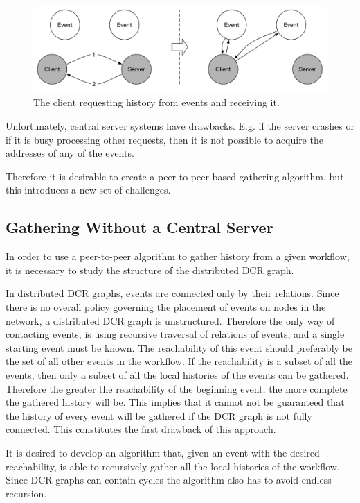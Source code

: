     \begin{figure}[H]
    	\centering
    	\includegraphics[width=\textwidth]{4connect/images/server-contacts-events.pdf}
    	\caption{The client requesting history from events and receiving it.}
    	\label{fig:connecting:server-contacts-events}
    \end{figure}
    
    \newpar Unfortunately, central server systems have drawbacks. E.g. if the server crashes or if it is busy processing other requests, then it is not possible to acquire the addresses of any of the events.
    
    Therefore it is desirable to create a peer to peer-based gathering algorithm, but this introduces a new set of challenges.
    
    \subsection{Gathering Without a Central Server}
    In order to use a peer-to-peer algorithm to gather history from a given workflow, it is necessary to study the structure of the distributed DCR graph.
    
    \newpar In distributed DCR graphs, events are connected only by their relations. Since there is no overall policy governing the placement of events on nodes in the network, a distributed DCR graph is unstructured. Therefore the only way of contacting events, is using recursive traversal of relations of events, and a single starting event must be known. The reachability of this event should preferably be the set of all other events in the workflow. If the reachability is a subset of all the events, then only a subset of all the local histories of the events can be gathered. Therefore the greater the reachability of the beginning event, the more complete the gathered history will be. This implies that it cannot not be guaranteed that the history of every event will be gathered if the DCR graph is not fully connected. This constitutes the first drawback of this approach.
	
	It is desired to develop an algorithm that, given an event with the desired reachability, is able to recursively gather all the local histories of the workflow. Since DCR graphs can contain cycles the algorithm also has to avoid endless recursion.
		
